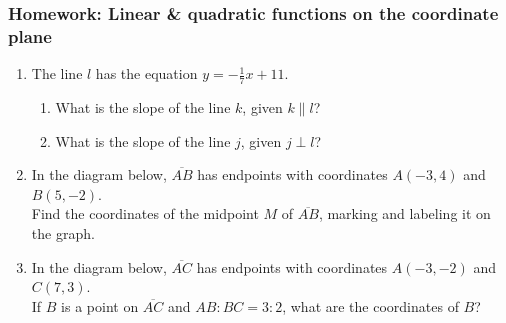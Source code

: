 \documentclass[12pt, twoside]{article}
\begin{document}
\subsubsection*{Homework: Linear \& quadratic functions on the coordinate plane}
  \begin{enumerate}
    
  \item The line $l$ has the equation $y=-\frac{1}{7}x+11$.
    \begin{enumerate}
      \item What is the slope of the line $k$, given $k \parallel l$?
      \vspace{0.5cm}
      \item What is the slope of the line $j$, given $j \perp l$?
      \vspace{0.5cm}
    \end{enumerate}

  \item In the diagram below, $\overline{AB}$ has endpoints with coordinates $A(-3,4)$ and $B(5, -2)$.\\[0.25cm]
  Find the coordinates of the midpoint $M$ of $\overline{AB}$, marking and labeling it on the graph.
    \begin{flushright} %
    \end{flushright}

  \item In the diagram below, $\overline{AC}$ has endpoints with coordinates $A(-3,-2)$ and $C(7, 3)$.\\[0.25cm]
  If $B$ is a point on $\overline{AC}$ and $AB {:} BC = 3{:}2$,  what  are  the coordinates of $B$?
    \begin{flushright} %
    \end{flushright}


\end{enumerate}
\end{document}
